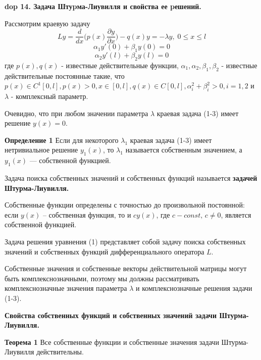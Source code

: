 \textbf{\LARGE dop 14. Задача Штуpма-Лиувилля и свойства ее pешений.}

Рассмотрим краевую задачу
\begin{equation}\tag{1}
    Ly = \frac{d}{dx} \Big( p(x) \frac{\partial y}{\partial x} \Big) - q(x) y = - \lambda y, \; 0\leq x \leq l
\end{equation}
\begin{equation}\tag{2}
    \alpha_1 y'(0)+\beta_1 y(0)=0
\end{equation}
\begin{equation}\tag{3}
    \alpha_2 y'(l)+\beta_2 y(l)=0
\end{equation}
где $p(x), q(x)$ - известные действительные функции, $\alpha_1, \alpha_2, \beta_1, \beta_2$ - известные действительные постоянные такие, что $p(x)\in C^1[0,l], p(x)>0, x\in[0,l], q(x)\in C[0,l], \alpha_i^2+\beta_i^2>0, i=1,2$ и $\lambda$ - комплексный параметр.

Очевидно, что при любом значении параметра $\lambda$ краевая задача (1-3) имеет решение $y(x) = 0$.

\textbf{Определение 1} Если для некоторого $\lambda_1$ краевая задача (1-3) имеет нетривиальное решение $y_1(x)$, то $\lambda_1$ называется собственным значением, а $y_1(x)$ --- собственной функцией.

Задача поиска собственных значений и собственных функций называется \textbf{задачей Штурма-Лиувилля.}

Собственные функции определены с точностью до произвольной постоянной: если $y(x)$ – собственная функция, то и $cy(x)$, где $c-const, \, c \neq 0$, является собственной функцией.

Задача решения уравнения (1) представляет собой задачу поиска собственных значений и собственных функций дифференциального
оператора $L$.

Собственные значения и собственные векторы действительной матрицы могут быть комплекснозначными, поэтому мы должны рассматривать комплекснозначные значения параметра $\lambda$ и комплекснозначные решения задачи (1-3).

\textbf{Свойства собственных функций и собственных значений задачи Штурма-Лиувилля.}

\textbf{Теорема 1} Все собственные функции и собственные значения
задачи Штурма-Лиувилля действительны.

